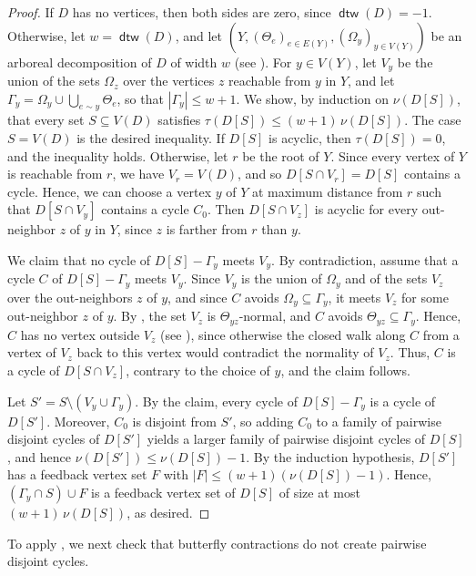 \documentclass[fontsize=12pt,leading=14pt]{fullpaper}
\DeclareMathOperator{\dtw}{\mathsf{dtw}}
\begin{document}
\begin{proof}
  If $D$ has no vertices, then both sides are zero, since $\dtw(D)=-1$.
  Otherwise, let $w=\dtw(D)$, and let $(Y,(\Theta_e)_{e\in E(Y)},(\Omega_y)_{y\in V(Y)})$ be an arboreal decomposition of $D$ of width $w$ (see ).
  For $y\in V(Y)$, let $V_y$ be the union of the sets $\Omega_z$ over the vertices $z$ reachable from $y$ in $Y$, and let $\Gamma_y=\Omega_y\cup\bigcup_{e\sim y}\Theta_e$, so that $|\Gamma_y|\le w+1$.
  We show, by induction on $\nu(D[S])$, that every set $S\subseteq V(D)$ satisfies $\tau(D[S])\le(w+1)\,\nu(D[S])$.
  The case $S=V(D)$ is the desired inequality.
  If $D[S]$ is acyclic, then $\tau(D[S])=0$, and the inequality holds.
  Otherwise, let $r$ be the root of $Y$.
  Since every vertex of $Y$ is reachable from $r$, we have $V_r=V(D)$, and so $D[S\cap V_r]=D[S]$ contains a cycle.
  Hence, we can choose a vertex $y$ of $Y$ at maximum distance from $r$ such that $D[S\cap V_y]$ contains a cycle $C_0$.
  Then $D[S\cap V_z]$ is acyclic for every out-neighbor $z$ of $y$ in $Y$, since $z$ is farther from $r$ than $y$.

  We claim that no cycle of $D[S]-\Gamma_y$ meets $V_y$.
  By contradiction, assume that a cycle $C$ of $D[S]-\Gamma_y$ meets $V_y$.
  Since $V_y$ is the union of $\Omega_y$ and of the sets $V_z$ over the out-neighbors $z$ of $y$, and since $C$ avoids $\Omega_y\subseteq\Gamma_y$, it meets $V_z$ for some out-neighbor $z$ of $y$.
  By , the set $V_z$ is $\Theta_{yz}$-normal, and $C$ avoids $\Theta_{yz}\subseteq\Gamma_y$.
  Hence, $C$ has no vertex outside $V_z$ (see ), since otherwise the closed walk along $C$ from a vertex of $V_z$ back to this vertex would contradict the normality of $V_z$.
  Thus, $C$ is a cycle of $D[S\cap V_z]$, contrary to the choice of $y$, and the claim follows.

  Let $S'=S\setminus(V_y\cup\Gamma_y)$.
  By the claim, every cycle of $D[S]-\Gamma_y$ is a cycle of $D[S']$.
  Moreover, $C_0$ is disjoint from $S'$, so adding $C_0$ to a family of pairwise disjoint cycles of $D[S']$ yields a larger family of pairwise disjoint cycles of $D[S]$, and hence $\nu(D[S'])\le\nu(D[S])-1$.
  By the induction hypothesis, $D[S']$ has a feedback vertex set $F$ with $|F|\le(w+1)(\nu(D[S])-1)$.
  Hence, $(\Gamma_y\cap S)\cup F$ is a feedback vertex set of $D[S]$ of size at most $(w+1)\,\nu(D[S])$, as desired.
\end{proof}

To apply , we next check that butterfly contractions do not create pairwise disjoint cycles.
\end{document}
